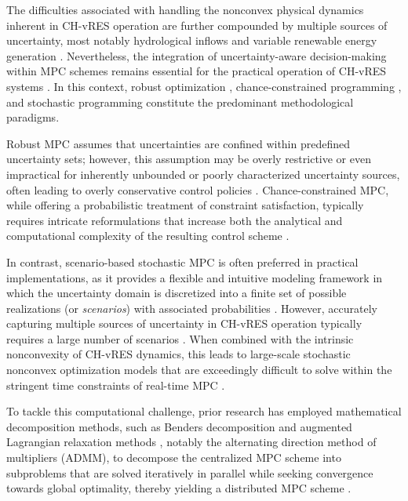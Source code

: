 \documentclass[a4paper,fleqn]{cas-sc}
\begin{document}
The difficulties associated with handling the nonconvex physical dynamics inherent in CH-vRES operation are further compounded by multiple sources of uncertainty, most notably hydrological inflows and variable renewable energy generation \citep{qiu2020stochastic}.
Nevertheless, the integration of uncertainty-aware decision-making within MPC schemes remains essential for the practical operation of CH-vRES systems \citep{zhang2022long}.
In this context, robust optimization \citep{zhou2021100}, chance-constrained programming \citep{zhang2022chance}, and stochastic programming \citep{shi2024stochastic} constitute the predominant methodological paradigms.

Robust MPC assumes that uncertainties are confined within predefined uncertainty sets; however, this assumption may be overly restrictive or even impractical for inherently unbounded or poorly characterized uncertainty sources, often leading to overly conservative control policies \citep{saltik2018outlook}.
Chance-constrained MPC, while offering a probabilistic treatment of constraint satisfaction, typically requires intricate reformulations that increase both the analytical and computational complexity of the resulting control scheme \citep{lyons2012chance}.

In contrast, scenario-based stochastic MPC is often preferred in practical implementations, as it provides a flexible and intuitive modeling framework in which the uncertainty domain is discretized into a finite set of possible realizations (or \textit{scenarios}) with associated probabilities \citep{jeong2023implementation}.
However, accurately capturing multiple sources of uncertainty in CH-vRES operation typically requires a large number of scenarios \citep{zhang2019coordinated}.
When combined with the intrinsic nonconvexity of CH-vRES dynamics, this leads to large-scale stochastic nonconvex optimization models that are exceedingly difficult to solve within the stringent time constraints of real-time MPC \citep{velarde2019scenario}.

To tackle this computational challenge, prior research has employed mathematical decomposition methods,
such as Benders decomposition \citep{lopez2018stochastic} and augmented Lagrangian relaxation methods \citep{11270217},
notably the alternating direction method of multipliers (ADMM),
to decompose the centralized MPC scheme into subproblems that are solved iteratively in parallel while seeking convergence towards global optimality, thereby yielding a distributed MPC scheme \citep{santosuosso2024distributed}.
\end{document}
